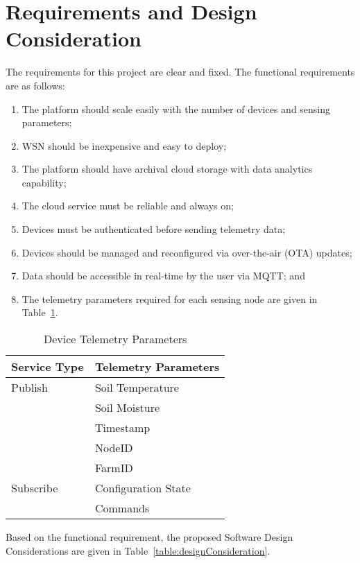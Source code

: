 \section{Requirements and Design Consideration}

\noindent
The requirements for this project are clear and fixed. The functional requirements are as follows:
\begin{enumerate}
  \item The platform should scale easily with the number of devices and sensing parameters;
  \item WSN should be inexpensive and easy to deploy;
  \item The platform should have archival cloud storage with data analytics capability;
  \item The cloud service must be reliable and always on;
  \item Devices must be authenticated before sending telemetry data;
  \item Devices should be managed and reconfigured via over-the-air (OTA) updates;
  \item Data should be accessible in real-time by the user via MQTT; and
  \item The telemetry parameters required for each sensing node are given in Table~\ref{table:telemetryParameters}.
\end{enumerate}

\renewcommand{\floatpagefraction}{0.9}
\renewcommand{\arraystretch}{1.1}
\begin{table}[ht]
\centering
\begin{tabular}{ p{5.2cm} p{6.2cm}}
  \hline
  \textbf{Service Type} & \textbf{Telemetry Parameters}\\
  \hline
  Publish & Soil Temperature\\
  & Soil Moisture\\
  & Timestamp\\
  & NodeID\\
  & FarmID\\
  \hline
  Subscribe & Configuration State\\
  & Commands\\
  \hline
\end{tabular}
\caption{Device Telemetry Parameters} 
\label{table:telemetryParameters}
\end{table} 

\noindent
Based on the functional requirement, the proposed Software Design Considerations are given in Table~\ref{table:designConsideration}.

